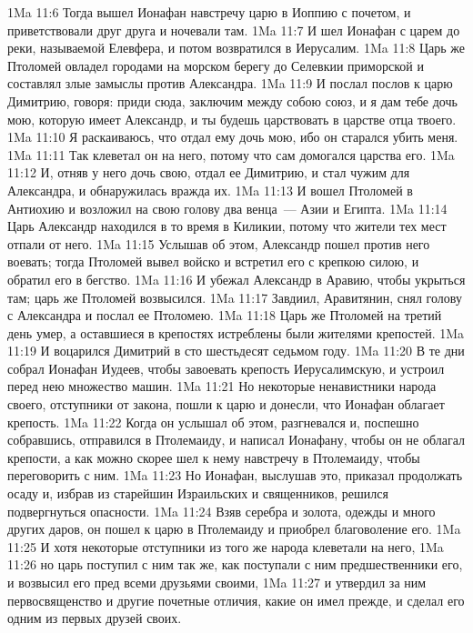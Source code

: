 \vs 1Ma 11:6 Тогда вышел Ионафан навстречу царю в Иоппию с почетом, и приветствовали друг друга и ночевали там.
\vs 1Ma 11:7 И шел Ионафан с царем до реки, называемой Елевфера, и потом возвратился в Иерусалим.
\vs 1Ma 11:8 Царь же Птоломей овладел городами на морском берегу до Селевкии приморской и составлял злые замыслы против Александра.
\vs 1Ma 11:9 И послал послов к царю Димитрию, говоря: приди сюда, заключим между собою союз, и я дам тебе дочь мою, которую имеет Александр, и ты будешь царствовать в царстве отца твоего.
\vs 1Ma 11:10 Я раскаиваюсь, что отдал ему дочь мою, ибо он старался убить меня.
\vs 1Ma 11:11 Так клеветал он на него, потому что сам домогался царства его.
\vs 1Ma 11:12 И, отняв у него дочь свою, отдал ее Димитрию, и стал чужим для Александра, и обнаружилась вражда их.
\vs 1Ma 11:13 И вошел Птоломей в Антиохию и возложил на свою голову два венца~--- Азии и Египта.
\vs 1Ma 11:14 Царь Александр находился в то время в Киликии, потому что жители тех мест отпали от него.
\vs 1Ma 11:15 Услышав об этом, Александр пошел против него воевать; тогда Птоломей вывел войско и встретил его с крепкою силою, и обратил его в бегство.
\vs 1Ma 11:16 И убежал Александр в Аравию, чтобы укрыться там; царь же Птоломей возвысился.
\vs 1Ma 11:17 Завдиил, Аравитянин, снял голову с Александра и послал ее Птоломею.
\vs 1Ma 11:18 Царь же Птоломей на третий день умер, а оставшиеся в крепостях истреблены были жителями крепостей.
\vs 1Ma 11:19 И воцарился Димитрий в сто шестьдесят седьмом году.
\rsbpar\vs 1Ma 11:20 В те дни собрал Ионафан Иудеев, чтобы завоевать крепость Иерусалимскую, и устроил перед нею множество машин.
\vs 1Ma 11:21 Но некоторые ненавистники народа своего, отступники от закона, пошли к царю и донесли, что Ионафан облагает крепость.
\vs 1Ma 11:22 Когда он услышал об этом, разгневался и, поспешно собравшись, отправился в Птолемаиду, и написал Ионафану, чтобы он не облагал крепости, а как можно скорее шел к нему навстречу в Птолемаиду, чтобы переговорить с ним.
\vs 1Ma 11:23 Но Ионафан, выслушав это, приказал продолжать осаду и, избрав из старейшин Израильских и священников, решился подвергнуться опасности.
\vs 1Ma 11:24 Взяв серебра и золота, одежды и много других даров, он пошел к царю в Птолемаиду и приобрел благоволение его.
\vs 1Ma 11:25 И хотя некоторые отступники из того же народа клеветали на него,
\vs 1Ma 11:26 но царь поступил с ним так же, как поступали с ним предшественники его, и возвысил его пред всеми друзьями своими,
\vs 1Ma 11:27 и утвердил за ним первосвященство и другие почетные отличия, какие он имел прежде, и сделал его одним из первых друзей своих.
